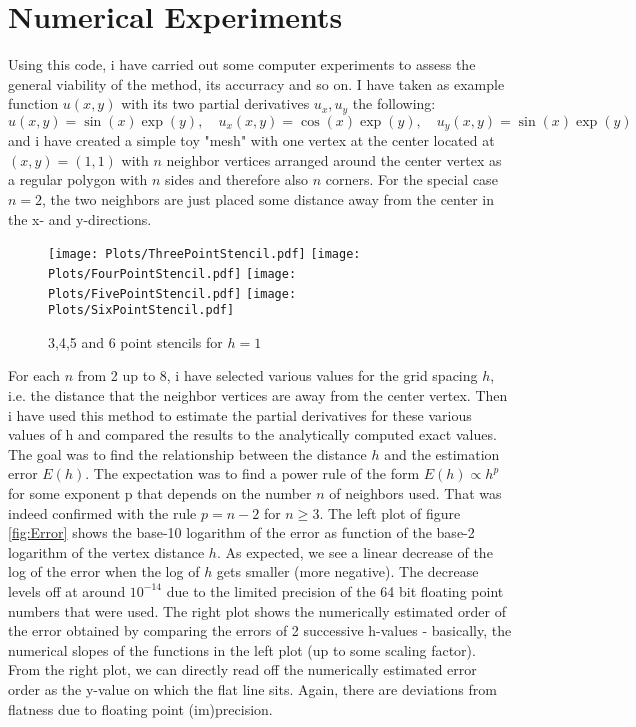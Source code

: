 \section{Numerical Experiments}
Using this code, i have carried out some computer experiments to assess the general viability of the method, its accurracy and so on. I have taken as example function $u(x,y)$ with its two partial derivatives $u_x,u_y$ the following:
\begin{equation}
u(x,y)   = \sin (x) \exp (y), \quad 
u_x(x,y) = \cos (x) \exp (y), \quad
u_y(x,y) = \sin (x) \exp (y)
\end{equation}
and i have created a simple toy "mesh" with one vertex at the center located at $(x,y)=(1,1)$ with $n$ neighbor vertices arranged around the center vertex as a regular polygon with $n$ sides and therefore also $n$ corners. For the special case $n=2$, the two neighbors are just placed some distance away from the center in the x- and y-directions.
\begin{figure}[h]
	\centering
  	\texttt{[image: Plots/ThreePointStencil.pdf]}
  	\texttt{[image: Plots/FourPointStencil.pdf]}
  	\texttt{[image: Plots/FivePointStencil.pdf]}
  	\texttt{[image: Plots/SixPointStencil.pdf]}
	\caption{3,4,5 and 6 point stencils for $h=1$}
	\label{fig:FivePointStencil}
\end{figure}
For each $n$ from 2 up to 8, i have selected various values for the grid spacing $h$, i.e. the distance that the neighbor vertices are away from the center vertex. Then i have used this method to estimate the partial derivatives for these various values of h and compared the results to the analytically computed exact values. The goal was to find the relationship between the distance $h$ and the estimation error $E(h)$. The expectation was to find a power rule of the form $E(h) \propto h^p$ for some exponent p that depends on the number $n$ of neighbors used. That was indeed confirmed with the rule $p = n-2$ for $n \geq 3$. The left plot of figure \ref{fig:Error} shows the base-10 logarithm of the error as function of the base-2 logarithm of the vertex distance $h$. As expected, we see a linear decrease of the log of the error when the log of $h$ gets smaller (more negative). The decrease levels off at around $10^{-14}$ due to the limited precision of the 64 bit floating point numbers that were used. The right plot shows the numerically estimated order of the error obtained by comparing the errors of 2 successive h-values - basically, the numerical slopes of the functions in the left plot (up to some scaling factor). From the right plot, we can directly read off the numerically estimated error order as the y-value on which the flat line sits. Again, there are deviations from flatness due to floating point (im)precision.
